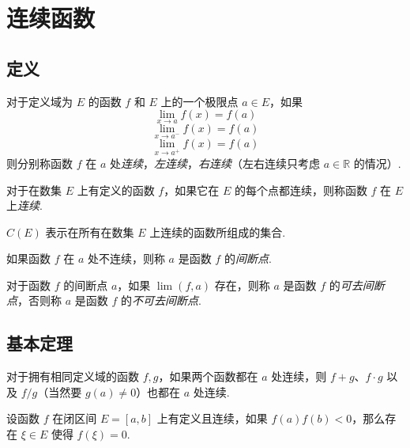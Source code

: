 \section{连续函数}
\subsection{定义}
\begin{definition}
    对于定义域为 $E$ 的函数 $f$ 和 $E$ 上的一个极限点 $a \in E$，如果
    \[\lim_{x \rightarrow a} f(x) = f(a)\]
    \[\lim_{x \rightarrow a^-} f(x) = f(a)\]
    \[\lim_{x \rightarrow a^+} f(x) = f(a)\]
    则分别称函数 $f$ 在 $a$ 处\emph{连续}，\emph{左连续}，\emph{右连续}（左右连续只考虑 $a \in \mathbb{R}$ 的情况）.
\end{definition}\vspace{9pt}

\begin{definition}
    对于在数集 $E$ 上有定义的函数 $f$，如果它在 $E$ 的每个点都连续，则称函数 $f$ 在 $E$ 上\emph{连续}.
\end{definition}\vspace{9pt}

\begin{definition}
    $C(E)$ 表示在所有在数集 $E$ 上连续的函数所组成的集合.
\end{definition}\vspace{9pt}

\begin{definition}
    如果函数 $f$ 在 $a$ 处不连续，则称 $a$ 是函数 $f$ 的\emph{间断点}.

    对于函数 $f$ 的间断点 $a$，如果 $\lim(f,a)$ 存在，则称 $a$ 是函数 $f$ 的\emph{可去间断点}，否则称 $a$ 是函数 $f$ 的\emph{不可去间断点}.
\end{definition}

\subsection{基本定理}
\begin{theorem}
    对于拥有相同定义域的函数 $f,g$，如果两个函数都在 $a$ 处连续，则 $f+g$、$f \cdot g$ 以及 $f/g$（当然要 $g(a) \neq 0$）也都在 $a$ 处连续.
\end{theorem}\vspace{9pt}

\begin{theorem}
    设函数 $f$ 在闭区间 $E = [a,b]$ 上有定义且连续，如果 $f(a)f(b) < 0$，那么存在 $\xi \in E$ 使得 $f(\xi) = 0$.
\end{theorem}